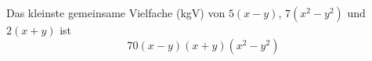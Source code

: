 
Das kleinste gemeinsame Vielfache (kgV) von $5(x-y)$, $7\left(x^2-y^2\right)$ und $2(x+y)$ ist 
\[
  70(x-y)(x+y)\left(x^2-y^2\right)
\]
